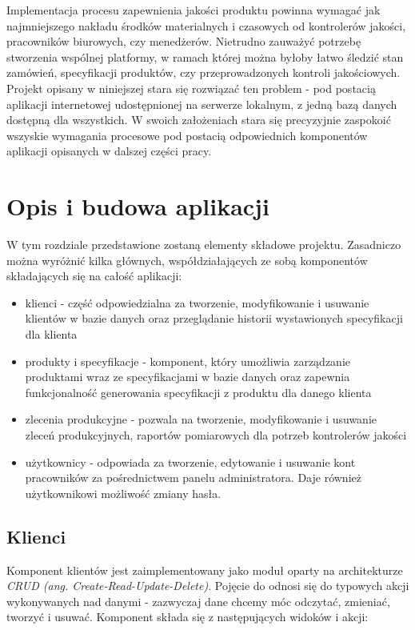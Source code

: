 \documentclass[declaration,shortabstract]{iithesis}
\begin{document}
Implementacja procesu zapewnienia jakości produktu powinna wymagać jak najmniejszego nakładu środków materialnych i czasowych od kontrolerów jakości, pracowników biurowych, czy menedżerów. Nietrudno zauważyć potrzebę stworzenia wspólnej platformy, w ramach której można byłoby łatwo śledzić stan zamówień, specyfikacji produktów, czy przeprowadzonych kontroli jakościowych. Projekt opisany w niniejszej stara się rozwiązać ten problem - pod postacią aplikacji internetowej udostępnionej na serwerze lokalnym, z jedną bazą danych dostępną dla wszystkich. W swoich założeniach stara się precyzyjnie zaspokoić wszyskie wymagania procesowe pod postacią odpowiednich komponentów aplikacji opisanych w dalszej części pracy.


\chapter{Opis i budowa aplikacji}
W tym rozdziale przedstawione zostaną elementy składowe projektu. Zasadniczo można wyróżnić kilka głównych, współdziałających ze sobą komponentów składających się na całość aplikacji:
\begin{itemize}
	\item klienci - część odpowiedzialna za tworzenie, modyfikowanie i usuwanie klientów w bazie danych oraz przeglądanie historii wystawionych specyfikacji dla klienta
	\item produkty i specyfikacje - komponent, który umożliwia zarządzanie produktami wraz ze specyfikacjami w bazie danych oraz zapewnia funkcjonalność generowania specyfikacji z produktu dla danego klienta
	\item zlecenia produkcyjne - pozwala na tworzenie, modyfikowanie i usuwanie zleceń produkcyjnych, raportów pomiarowych dla potrzeb kontrolerów jakości
	\item użytkownicy - odpowiada za tworzenie, edytowanie i usuwanie kont pracowników za pośrednictwem panelu administratora. Daje również użytkownikowi możliwość zmiany hasła.
\end{itemize}

\section{Klienci}
Komponent klientów jest zaimplementowany jako moduł oparty na architekturze \emph{CRUD (ang. Create-Read-Update-Delete)}. Pojęcie do odnosi się do typowych akcji wykonywanych nad danymi - zazwyczaj dane chcemy móc odczytać, zmieniać, tworzyć i usuwać. Komponent składa się z następujących widoków i akcji:
\end{document}
